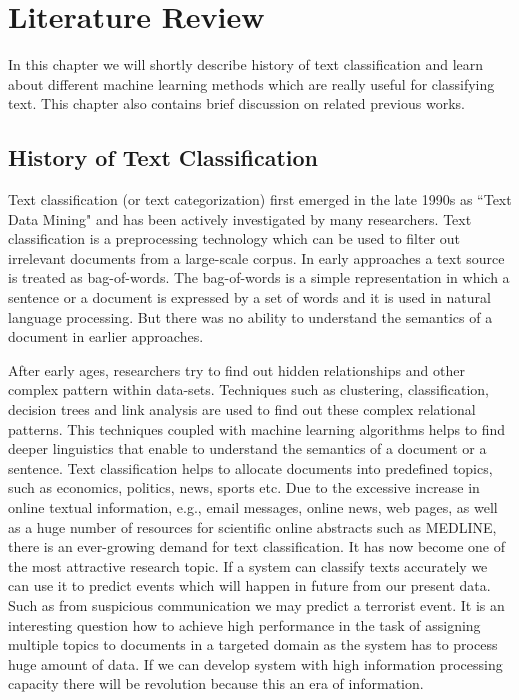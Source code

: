 \chapter{Literature Review}
\thispagestyle{empty}
In this chapter we will shortly describe history of text classification and learn about different machine learning methods which are really useful for classifying text. This chapter also contains brief discussion on related previous works.

\section{History of Text Classification}
Text classification (or text categorization)  first emerged in the late 1990s as ``Text Data Mining" and has been actively investigated by many researchers. Text classification is a preprocessing technology which can be used to filter out irrelevant documents from a large-scale corpus. In early approaches a text source is treated as bag-of-words. The bag-of-words is a simple representation in which a sentence or a document is expressed by a set of words and it is used in natural language processing. But there was no ability to understand the semantics of a document in earlier approaches.\par
\vspace{.5cm}
After early ages, researchers try to find out hidden relationships and other complex pattern within data-sets. Techniques such as clustering, classification, decision trees and link analysis are used to find out these complex relational patterns. This techniques coupled with machine learning algorithms helps to find deeper linguistics that enable to understand the semantics of a document or a sentence. Text classification helps to allocate documents into predefined topics, such as economics, politics, news, sports etc. Due to the excessive increase in online textual information, e.g., email messages, online news, web pages, as well as a huge number of resources for scientific online abstracts such as MEDLINE, there is an ever-growing demand for text classification. It has now become one of the most attractive research topic. If a system can classify texts accurately we can use it to predict events which will happen in future from our present data. Such as from suspicious communication we may predict a terrorist event. It is an interesting question how to achieve high performance in the task of assigning multiple topics to documents in a targeted domain as the system has to process huge amount of data. If we can develop system with high information processing capacity there will be revolution because this an era of information.


